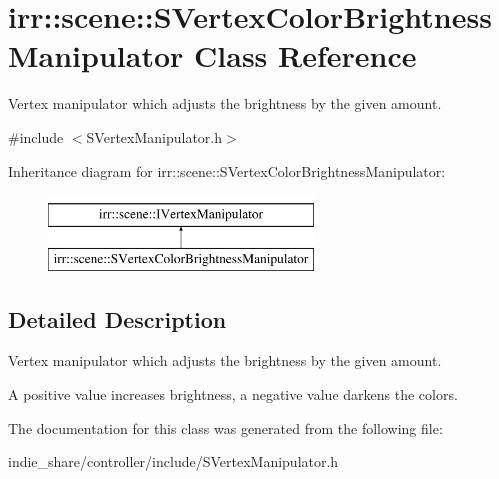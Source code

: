 \hypertarget{classirr_1_1scene_1_1SVertexColorBrightnessManipulator}{}\section{irr\+:\+:scene\+:\+:S\+Vertex\+Color\+Brightness\+Manipulator Class Reference}
\label{classirr_1_1scene_1_1SVertexColorBrightnessManipulator}


Vertex manipulator which adjusts the brightness by the given amount.  




{\ttfamily \#include $<$S\+Vertex\+Manipulator.\+h$>$}

Inheritance diagram for irr\+:\+:scene\+:\+:S\+Vertex\+Color\+Brightness\+Manipulator\+:\begin{figure}[H]
\begin{center}
\leavevmode
\includegraphics[height=2.000000cm]{classirr_1_1scene_1_1SVertexColorBrightnessManipulator}
\end{center}
\end{figure}


\subsection{Detailed Description}
Vertex manipulator which adjusts the brightness by the given amount. 

A positive value increases brightness, a negative value darkens the colors. 

The documentation for this class was generated from the following file\+:\begin{DoxyCompactItemize}
\item 
indie\+\_\+share/controller/include/S\+Vertex\+Manipulator.\+h\end{DoxyCompactItemize}
